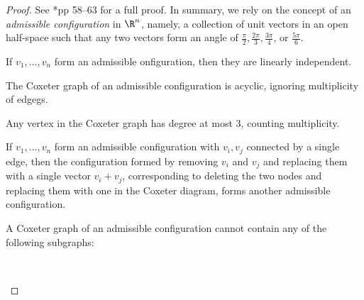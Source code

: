 \documentclass[11pt,leqno,oneside]{amsart}
\numberwithin{thm}{section}
\begin{document}
\begin{proof}
  See \cite{humph}*{pp 58--63} for a full proof. In summary, we rely
  on the 
  concept of an \emph{admissible configuration} in 
  \(\R^n\), namely, a collection of unit vectors in an open half-space
  such that any two vectors form an angle of \(\frac{\pi}{2},
  \frac{2\pi}{3}, \frac{3\pi}{4}\), or \(\frac{5\pi}{6}\).
  \begin{lem}
    If \(v_1, \ldots, v_n\) form an admissible onfiguration, then they
    are linearly independent.
  \end{lem}
  \begin{lem}
    The Coxeter graph of an admissible configuration is acyclic,
    ignoring multiplicity of edgegs.  
  \end{lem}
  \begin{lem}
    Any vertex in the Coxeter graph has degree at most \(3\),
    counting multiplicity.
  \end{lem}
  \begin{lem}
    If \(v_1, \ldots, v_n\) form an admissible configuration with
    \(v_i, v_j\) connected by a single edge, then the configuration
    formed by removing \(v_i\) and \(v_j\) and replacing them with a
    single vector \(v_i+v_j\), corresponding to deleting the two nodes
    and replacing them with one in the Coxeter diagram, forms another
    admissible configuration.
  \end{lem}
  \begin{lem}
    A Coxeter graph of an admissible configuration cannot contain any
    of the following subgraphs:
    \begin{center}
      \\
\end{center}
\end{lem}
\end{proof}
\end{document}
